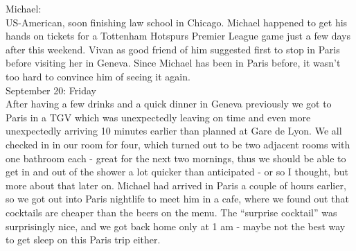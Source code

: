Michael:\\
US-American, soon finishing law school in Chicago. Michael happened to get his hands on tickets for a Tottenham Hotspurs Premier League game just a few days after this weekend. Vivan as good friend of him suggested first to stop in Paris before visiting her in Geneva. Since Michael has been in Paris before, it wasn't too hard to convince him of seeing it again. \\

September 20: Friday\\
After having a few drinks and a quick dinner in Geneva previously we got to Paris in a TGV which was unexpectedly leaving on time and even more unexpectedly arriving 10 minutes earlier than planned at Gare de Lyon. We all checked in in our room for four, which turned out to be two adjacent rooms with one bathroom each - great for the next two mornings, thus we should be able to get in and out of the shower a lot quicker than anticipated - or so I thought, but more about that later on. Michael had arrived in Paris a couple of hours earlier, so we got out into Paris nightlife to meet him in a cafe, where we found out that cocktails are cheaper than the beers on the menu. The ``surprise cocktail'' was surprisingly nice, and we got back home only at 1 am - maybe not the best way to get sleep on this Paris trip either.\\

